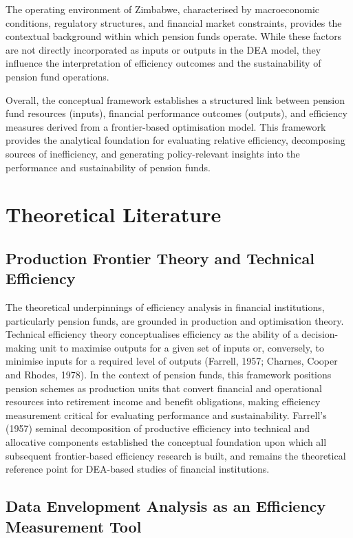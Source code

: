 \documentclass[12pt,a4paper]{article}
\begin{document}
The operating environment of Zimbabwe, characterised by macroeconomic conditions, regulatory structures, and financial market constraints, provides the contextual background within which pension funds operate. While these factors are not directly incorporated as inputs or outputs in the DEA model, they influence the interpretation of efficiency outcomes and the sustainability of pension fund operations.

Overall, the conceptual framework establishes a structured link between pension fund resources (inputs), financial performance outcomes (outputs), and efficiency measures derived from a frontier-based optimisation model. This framework provides the analytical foundation for evaluating relative efficiency, decomposing sources of inefficiency, and generating policy-relevant insights into the performance and sustainability of pension funds.

\section{Theoretical Literature}

\subsection{Production Frontier Theory and Technical Efficiency}

The theoretical underpinnings of efficiency analysis in financial institutions, particularly pension funds, are grounded in production and optimisation theory. Technical efficiency theory conceptualises efficiency as the ability of a decision-making unit to maximise outputs for a given set of inputs or, conversely, to minimise inputs for a required level of outputs (Farrell, 1957; Charnes, Cooper and Rhodes, 1978). In the context of pension funds, this framework positions pension schemes as production units that convert financial and operational resources into retirement income and benefit obligations, making efficiency measurement critical for evaluating performance and sustainability. Farrell's (1957) seminal decomposition of productive efficiency into technical and allocative components established the conceptual foundation upon which all subsequent frontier-based efficiency research is built, and remains the theoretical reference point for DEA-based studies of financial institutions.

\subsection{Data Envelopment Analysis as an Efficiency Measurement Tool}
\end{document}

